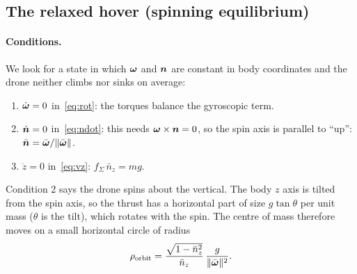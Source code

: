 \subsection{The relaxed hover (spinning equilibrium)}
\paragraph{Conditions.} We look for a state in which $\boldsymbol{\omega}$ and $\boldsymbol{n}$ are constant in body coordinates and the drone neither climbs nor sinks on average:
\begin{enumerate}
  \item $\dot{\boldsymbol{\omega}} = 0$ in~\eqref{eq:rot}: the torques balance the gyroscopic term.
  \item $\dot{\boldsymbol{n}} = 0$ in~\eqref{eq:ndot}: this needs $\boldsymbol{\omega}\times\boldsymbol{n} = 0$, so the spin axis is parallel to ``up'': $\bar{\boldsymbol{n}} = \bar{\boldsymbol{\omega}}/\|\bar{\boldsymbol{\omega}}\|$.
  \item $\ddot z = 0$ in~\eqref{eq:vz}: $f_\Sigma\,\bar n_z = mg$.
\end{enumerate}
Condition 2 says the drone spins about the vertical. The body $z$ axis is tilted from the spin axis, so the thrust has a horizontal part of size $g\tan\theta$ per unit mass ($\theta$ is the tilt), which rotates with the spin. The centre of mass therefore moves on a small horizontal circle of radius
\begin{equation}
  \rho_{\text{orbit}} = \frac{\sqrt{1-\bar n_z^2}}{\bar n_z}\,\frac{g}{\|\bar{\boldsymbol{\omega}}\|^2}.
\end{equation}

